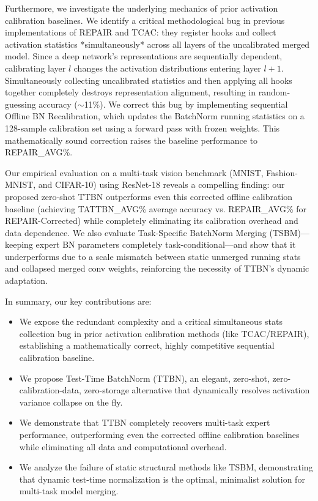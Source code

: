 \documentclass{article}
\theoremstyle{plain}
\theoremstyle{definition}
\theoremstyle{remark}
\begin{document}
Furthermore, we investigate the underlying mechanics of prior activation calibration baselines. We identify a critical methodological bug in previous implementations of REPAIR and TCAC: they register hooks and collect activation statistics *simultaneously* across all layers of the uncalibrated merged model. Since a deep network's representations are sequentially dependent, calibrating layer $l$ changes the activation distributions entering layer $l+1$. Simultaneously collecting uncalibrated statistics and then applying all hooks together completely destroys representation alignment, resulting in random-guessing accuracy ($\sim$11\%). We correct this bug by implementing sequential Offline BN Recalibration, which updates the BatchNorm running statistics on a 128-sample calibration set using a forward pass with frozen weights. This mathematically sound correction raises the baseline performance to {{REPAIR_AVG}}\%.

Our empirical evaluation on a multi-task vision benchmark (MNIST, Fashion-MNIST, and CIFAR-10) using ResNet-18 reveals a compelling finding: our proposed zero-shot TTBN outperforms even this corrected offline calibration baseline (achieving {{TATTBN_AVG}}\% average accuracy vs. {{REPAIR_AVG}}\% for REPAIR-Corrected) while completely eliminating its calibration overhead and data dependence. We also evaluate Task-Specific BatchNorm Merging (TSBM)—keeping expert BN parameters completely task-conditional—and show that it underperforms due to a scale mismatch between static unmerged running stats and collapsed merged conv weights, reinforcing the necessity of TTBN's dynamic adaptation.

In summary, our key contributions are:
\begin{itemize}
    \item We expose the redundant complexity and a critical simultaneous stats collection bug in prior activation calibration methods (like TCAC/REPAIR), establishing a mathematically correct, highly competitive sequential calibration baseline.
    \item We propose Test-Time BatchNorm (TTBN), an elegant, zero-shot, zero-calibration-data, zero-storage alternative that dynamically resolves activation variance collapse on the fly.
    \item We demonstrate that TTBN completely recovers multi-task expert performance, outperforming even the corrected offline calibration baselines while eliminating all data and computational overhead.
    \item We analyze the failure of static structural methods like TSBM, demonstrating that dynamic test-time normalization is the optimal, minimalist solution for multi-task model merging.
\end{itemize}
\end{document}
